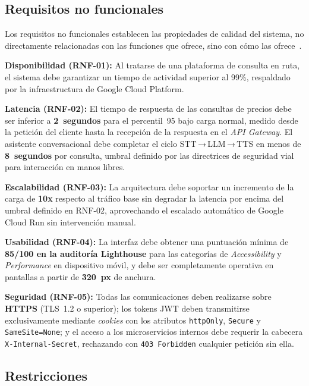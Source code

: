 \subsection{Requisitos no funcionales}
\label{subsec:requisitos_no_funcionales}

Los requisitos no funcionales establecen las propiedades de calidad del sistema, no
directamente relacionadas con las funciones que ofrece, sino con cómo las
ofrece~\cite{sommerville2011}.

\textbf{Disponibilidad (RNF-01):} Al tratarse de una plataforma de consulta en ruta, el
sistema debe garantizar un tiempo de actividad superior al 99\%, respaldado por la
infraestructura de Google Cloud Platform.

\textbf{Latencia (RNF-02):} El tiempo de respuesta de las consultas de precios
debe ser inferior a \textbf{2~segundos} para el percentil~95 bajo carga normal,
medido desde la petición del cliente hasta la recepción de la respuesta en el
\textit{API Gateway}. El asistente conversacional debe completar el ciclo
STT\,→\,LLM\,→\,TTS en menos de \textbf{8~segundos} por consulta, umbral
definido por las directrices de seguridad vial para interacción en manos libres.

\textbf{Escalabilidad (RNF-03):} La arquitectura debe soportar un incremento de
la carga de \textbf{10x} respecto al tráfico base sin degradar la latencia por
encima del umbral definido en RNF-02, aprovechando el escalado automático de
Google Cloud Run sin intervención manual.

\textbf{Usabilidad (RNF-04):} La interfaz debe obtener una puntuación mínima de
\textbf{85/100 en la auditoría Lighthouse} para las categorías de
\textit{Accessibility} y \textit{Performance} en dispositivo móvil, y debe ser
completamente operativa en pantallas a partir de \textbf{320~px} de anchura.

\textbf{Seguridad (RNF-05):} Todas las comunicaciones deben realizarse sobre
\textbf{HTTPS} (TLS~1.2 o superior); los tokens JWT deben transmitirse
exclusivamente mediante \textit{cookies} con los atributos \texttt{httpOnly},
\texttt{Secure} y \texttt{SameSite=None}; y el acceso a los microservicios
internos debe requerir la cabecera \texttt{X-Internal-Secret}, rechazando con
\texttt{403~Forbidden} cualquier petición sin ella.

\subsection{Restricciones}
\label{subsec:restricciones}

